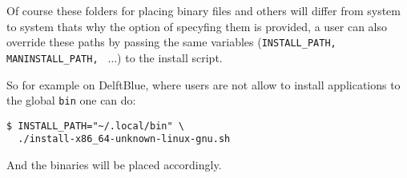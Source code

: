 Of course these folders for placing binary files and others will differ from system to system
thats why the option of specyfing them is provided, a user can also override these paths by
passing the same variables (\texttt{INSTALL\_PATH, MANINSTALL\_PATH, } $\dots$) to the install script.

So for example on DelftBlue, where users are not allow to install applications
to the global \texttt{bin} one can do:

\begin{verbatim}
$ INSTALL_PATH="~/.local/bin" \
  ./install-x86_64-unknown-linux-gnu.sh
\end{verbatim}

And the binaries will be placed accordingly.
